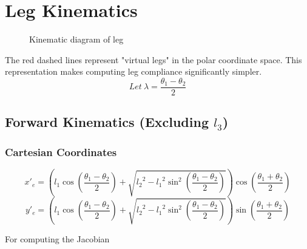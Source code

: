 \documentclass[11pt, titlepage]{article}
\begin{document}
\newpage
\section{Leg Kinematics}
\begin{figure}[h]
	\centering
	
	\caption{Kinematic diagram of leg}
\end{figure}

The red dashed lines represent "virtual legs" in the polar coordinate space. This representation makes computing leg compliance significantly simpler.\newline\newline
\begin{equation}
Let\ \lambda = \frac{\theta_1 - \theta_2}{2}
\end{equation}

\newpage
\subsection{Forward Kinematics (Excluding $l_3$)}
\subsubsection{Cartesian Coordinates}
\begin{equation}
	x'_e = \left(l_1\cos\left(\frac{\theta_1-\theta_2}{2}\right)+\sqrt{{l_2}^2-{l_1}^2\sin^2\left(\frac{\theta_1-\theta_2}{2}\right)}\right)\cos\left(\frac{\theta_1+\theta_2}{2}\right)
\end{equation}
\begin{equation}
	y'_e = \left(l_1\cos\left(\frac{\theta_1-\theta_2}{2}\right)+\sqrt{{l_2}^2-{l_1}^2\sin^2\left(\frac{\theta_1-\theta_2}{2}\right)}\right)\sin\left(\frac{\theta_1+\theta_2}{2}\right)
\end{equation}\newline

For computing the Jacobian
\end{document}
